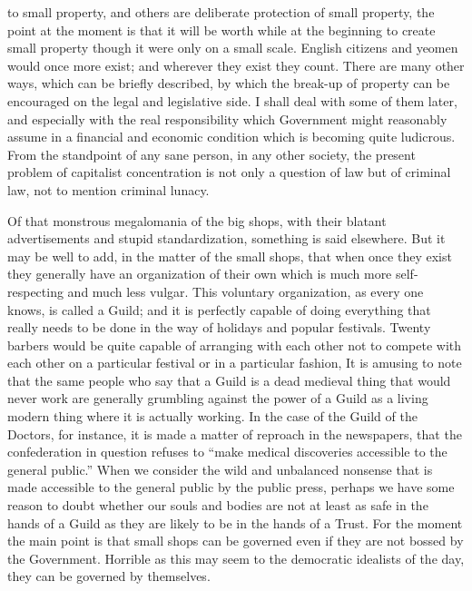 \documentclass{book}
\begin{document}
to small property, and others are deliberate protection of small property, the point at the moment is that it will be worth while at the beginning to create small property though it were only on a small scale. English citizens and yeomen would once more exist; and wherever they exist they count. There are many other ways, which can be briefly described, by which the break-up of property can be encouraged on the legal and legislative side. I shall deal with some of them later, and especially with the real responsibility which Government might reasonably assume in a financial and economic condition which is becoming quite ludicrous. From the standpoint of any sane person, in any other society, the present problem of capitalist concentration is not only a question of law but of criminal law, not to mention criminal lunacy.

Of that monstrous megalomania of the big shops, with their blatant advertisements and stupid standardization, something is said elsewhere. But it may be well to add, in the matter of the small shops, that when once they exist they generally have an organization of their own which is much more self-respecting and much less vulgar. This voluntary organization, as every one knows, is called a Guild; and it is perfectly capable of doing everything that really needs to be done in the way of holidays and popular festivals. Twenty barbers would be quite capable of arranging with each other not to compete with each other on a particular festival or in a particular fashion, It is amusing to note that the same people who say that a Guild is a dead medieval thing that would never work are generally grumbling against the power of a Guild as a living modern thing where it is actually working. In the case of the Guild of the Doctors, for instance, it is made a matter of reproach in the newspapers, that the confederation in question refuses to “make medical discoveries accessible to the general public.” When we consider the wild and unbalanced nonsense that is made accessible to the general public by the public press, perhaps we have some reason to doubt whether our souls and bodies are not at least as safe in the hands of a Guild as they are likely to be in the hands of a Trust. For the moment the main point is that small shops can be governed even if they are not bossed by the Government. Horrible as this may seem to the democratic idealists of the day, they can be governed by themselves.
\end{document}
